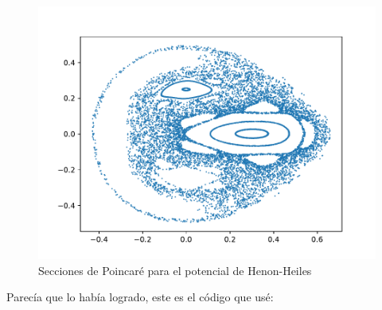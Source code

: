\documentclass[idxtotoc,hyperref,openany]{labbook} %
\begin{document}
\begin{figure}[H] %
\begin{center}
\includegraphics[width=1\linewidth]{henon_poinc.pdf}
\end{center}
\caption{Secciones de Poincaré para el potencial de Henon-Heiles}
\label{graficamathematica1}
\end{figure}

Parecía que lo había logrado, este es el código que usé:
\end{document}
